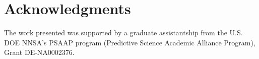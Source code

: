 \documentclass{anstrans}
\begin{document}
\section{Acknowledgments}
The work presented was supported by a graduate assistantship from the U.S. DOE NNSA's PSAAP program (Predictive Science Academic Alliance Program), Grant DE-NA0002376.  



\end{document}
